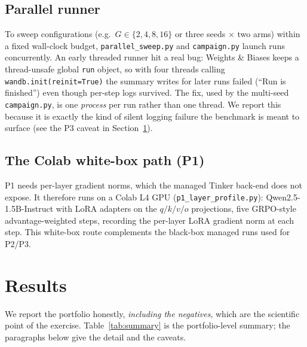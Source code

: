 \documentclass[12pt,a4paper]{report}
\begin{document}
\subsection{Parallel runner}
To sweep configurations (e.g.\ $G \in \{2,4,8,16\}$ or three seeds
$\times$ two arms) within a fixed wall-clock budget, \texttt{parallel\_sweep.py}
and \texttt{campaign.py} launch runs concurrently. An early threaded runner hit
a real bug: Weights \& Biases keeps a thread-unsafe global \texttt{run} object,
so with four threads calling \texttt{wandb.init(reinit=True)} the summary writes
for later runs failed (``Run is finished'') even though per-step logs survived.
The fix, used by the multi-seed \texttt{campaign.py}, is one \emph{process} per
run rather than one thread. We report this because it is exactly the kind of
silent logging failure the benchmark is meant to surface (see the P3 caveat in
Section~\ref{sec:results}).

\subsection{The Colab white-box path (P1)}
P1 needs per-layer gradient norms, which the managed Tinker back-end does not
expose. It therefore runs on a Colab L4 GPU
(\texttt{p1\_layer\_profile.py}): Qwen2.5-1.5B-Instruct with LoRA adapters on the
$q/k/v/o$ projections, five GRPO-style advantage-weighted steps, recording the
per-layer LoRA gradient norm at each step. This white-box route complements the
black-box managed runs used for P2/P3.

\section{Results}
\label{sec:results}

We report the portfolio honestly, \emph{including the negatives}, which are the
scientific point of the exercise. Table~\ref{tab:summary} is the portfolio-level
summary; the paragraphs below give the detail and the caveats.
\end{document}
